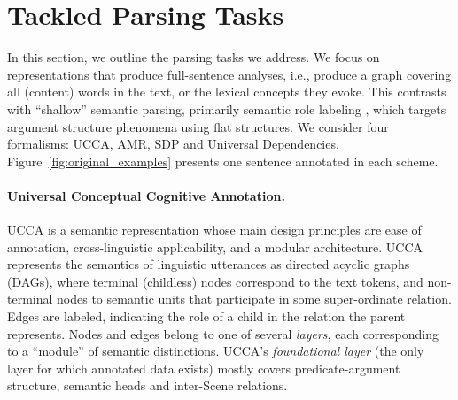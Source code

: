 \documentclass[11pt,a4paper]{article}
\newcommand{\oa}[1]{\footnote{\color{red}OA: #1}}
\begin{document}
\section{Tackled Parsing Tasks}\label{sec:tasks}

In this section, we outline the parsing tasks we address.
We focus on representations that produce full-sentence analyses,
i.e., produce a graph covering all (content) words in the text, 
or the lexical concepts they evoke.
This contrasts with ``shallow'' semantic parsing,
primarily semantic role labeling
\cite[SRL;][]{gildea2002automatic,Palmer:05},
which targets argument structure phenomena using flat structures.
We consider four formalisms: UCCA, AMR, SDP and Universal Dependencies.
Figure~\ref{fig:original_examples} presents one sentence annotated in each scheme.


\paragraph{Universal Conceptual Cognitive Annotation.}\label{sec:ucca}
UCCA \cite{abend2013universal} is a semantic representation whose main design principles
are ease of annotation, cross-linguistic applicability, and a modular architecture.
UCCA represents the semantics of linguistic utterances
as directed acyclic graphs (DAGs), where terminal (childless) nodes
correspond to the text tokens, and non-terminal nodes to semantic units that participate
in some super-ordinate relation.
Edges are labeled, indicating the role of a child in the relation the parent represents.
Nodes and edges belong to one of several \textit{layers}, each corresponding
to a ``module'' of semantic distinctions.
UCCA's \textit{foundational layer} (the only layer for which annotated data exists)
mostly covers predicate-argument structure, semantic heads and inter-Scene relations.
\end{document}
